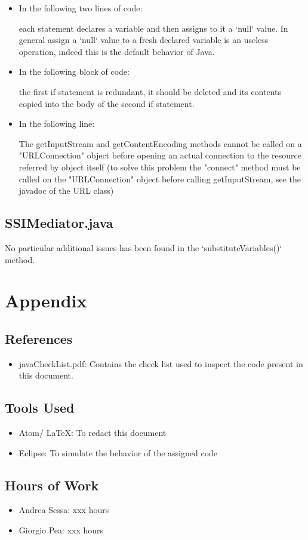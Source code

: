 \documentclass[11pt,titlepage]{article} %
\begin{document}
\begin{itemize}
\begin{itemize}
	     \item In the following two lines of code:
		
		each statement declares a variable and then assigns to it a `null` value. In general assign a `null` value to a fresh declared
		variable is an useless operation, indeed this is the default behavior of Java.
		
	     \item In the following block of code:
		
		the first if statement is redundant, it should be deleted and its contents copied into the body of the second if statement.
	     \item In the following line:
		
		  The getInputStream and getContentEncoding methods cannot be called on a "URLConnection" object before opening an actual connection
		  to the resource referred by object itself (to solve this problem the "connect" method must be called on the
		  "URLConnection" object before calling getInputStream, see the javadoc of the URL class)
	    \end{itemize}
   \end{itemize}
  \subsection{SSIMediator.java}
    No particular additional issues has been found in the `substituteVariables()` method.

\newpage
\section{Appendix}
\subsection{References}
   \begin{itemize}
    \item javaCheckList.pdf: Contains the check list used to inspect the code present in this document.
   \end{itemize}
\subsection{Tools Used}
  \begin{itemize}
   \item Atom/ \LaTeX: To redact this document
   \item Eclipse: To simulate the behavior of the assigned code
  \end{itemize}
\subsection{Hours of Work}
  \begin{itemize}
   \item Andrea Sessa: xxx hours
   \item Giorgio Pea: xxx hours
  \end{itemize}
\end{document}
